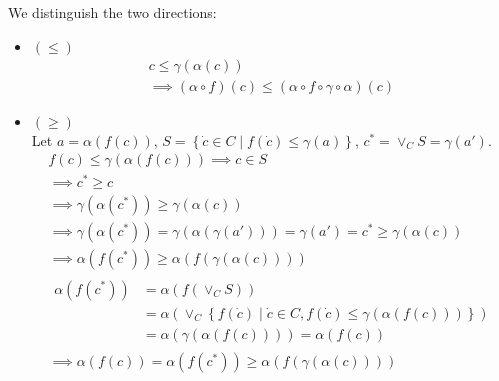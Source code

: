 \begin{exercise}
\begin{itemize}
        We distinguish the two directions:
        \begin{itemize}
            \item $(\leq)$
            \begin{gather*}
                c \leq \gamma(\alpha(c)) \\
                \implies (\alpha \circ f)(c) \leq (\alpha \circ f \circ \gamma \circ \alpha)(c)
            \end{gather*}
            \item $(\geq)$ \\
            Let $a = \alpha(f(c))$, $S = \left\{\dot{c} \in C \mid f(\dot{c}) \leq \gamma(a)\right\}$, $c^* = \vee_C S = \gamma(a')$.
            \begin{gather*}
                f(c) \leq \gamma(\alpha(f(c))) \implies c \in S \\
                \implies c^* \geq c \\
                \implies \gamma(\alpha(c^*)) \geq \gamma(\alpha(c)) \\
                \implies \gamma(\alpha(c^*)) = \gamma(\alpha(\gamma(a'))) = \gamma(a') = c^* \geq \gamma(\alpha(c)) \\
                \implies \alpha(f(c^*)) \geq \alpha(f(\gamma(\alpha(c)))) \\
                \begin{aligned}
                    \alpha(f(c^*)) &= \alpha(f(\vee_C S)) \\
                    &= \alpha(\vee_C \left\{f(\dot{c}) \mid \dot{c} \in C, f(\dot{c}) \leq \gamma(\alpha(f(c)))\right\}) \\
                    &= \alpha(\gamma(\alpha(f(c)))) = \alpha(f(c))
                \end{aligned} \\
                \implies \alpha(f(c)) = \alpha(f(c^*)) \geq \alpha(f(\gamma(\alpha(c))))
            \end{gather*}
        \end{itemize}
    \end{itemize}
\end{exercise}
